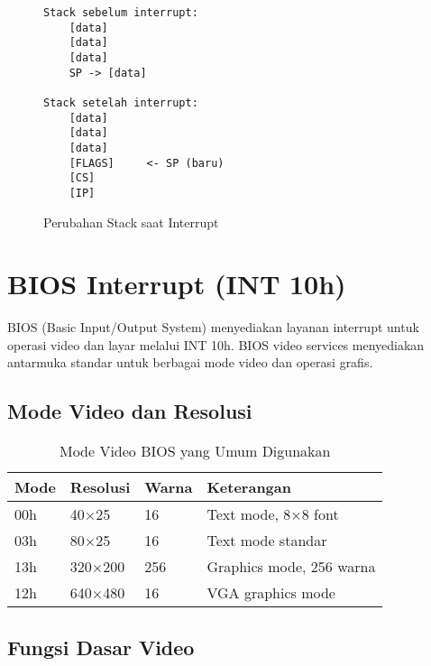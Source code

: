 \documentclass[../main.tex]{subfiles}
\begin{document}
            \begin{figure}[H]
                \centering
                \begin{verbatim}
Stack sebelum interrupt:
    [data]
    [data]
    [data]
    SP -> [data]

Stack setelah interrupt:
    [data]
    [data]
    [data]
    [FLAGS]     <- SP (baru)
    [CS]
    [IP]
                \end{verbatim}
                \caption{Perubahan Stack saat Interrupt}
            \end{figure}

    \section{BIOS Interrupt (INT 10h)}
        BIOS (Basic Input/Output System) menyediakan layanan interrupt untuk operasi video dan layar melalui INT 10h. BIOS video services menyediakan antarmuka standar untuk berbagai mode video dan operasi grafis.

        \subsection{Mode Video dan Resolusi}
            \begin{table}[H]
                \centering
                \caption{Mode Video BIOS yang Umum Digunakan}
                \begin{tabular}{|p{1.5cm}|p{2.5cm}|p{2cm}|p{7cm}|}
                    \hline
                    \textbf{Mode} & \textbf{Resolusi} & \textbf{Warna} & \textbf{Keterangan} \\
                    \hline
                    00h & 40×25 & 16 & Text mode, 8×8 font \\
                    \hline
                    03h & 80×25 & 16 & Text mode standar \\
                    \hline
                    13h & 320×200 & 256 & Graphics mode, 256 warna \\
                    \hline
                    12h & 640×480 & 16 & VGA graphics mode \\
                    \hline
                \end{tabular}
            \end{table}

        \subsection{Fungsi Dasar Video}
\end{document}
